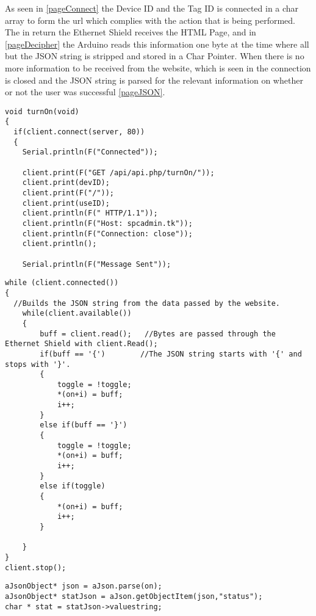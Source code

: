\documentclass{report}
\begin{document}
As seen in \autoref{pageConnect} the Device ID and the Tag ID is connected in a char array to form the url which complies with the action that is being performed. 
The in return the Ethernet Shield receives the HTML Page, and in \autoref{pageDecipher} the Arduino reads this information one byte at the time where all but the JSON string is stripped and stored in a Char Pointer.
When there is no more information to be received from the website, which is seen in  the connection is closed and the JSON string is parsed for the relevant information on whether or not the user was successful \autoref{pageJSON}.
\begin{lstlisting}[label=pageConnect, caption=Connecting to the Server and creating an HTML request.]
void turnOn(void)
{
  if(client.connect(server, 80))
  {
    Serial.println(F("Connected")); 

    client.print(F("GET /api/api.php/turnOn/"));
    client.print(devID);
    client.print(F("/"));
    client.print(useID);
    client.println(F(" HTTP/1.1"));
    client.println(F("Host: spcadmin.tk"));
    client.println(F("Connection: close"));
    client.println();
    
    Serial.println(F("Message Sent"));
\end{lstlisting}

\begin{lstlisting}[label=pageDecipher, caption=Removing all but the important information from the website.]
while (client.connected())
{
  //Builds the JSON string from the data passed by the website.
	while(client.available()) 
	{ 
		buff = client.read();   //Bytes are passed through the Ethernet Shield with client.Read();
		if(buff == '{')        //The JSON string starts with '{' and stops with '}'.
		{
			toggle = !toggle;
			*(on+i) = buff;
			i++;
		}
		else if(buff == '}')
		{
			toggle = !toggle;
			*(on+i) = buff;
			i++;
		}
		else if(toggle)
		{
			*(on+i) = buff;
			i++;
		}     

	}
}
client.stop();
\end{lstlisting}

\begin{lstlisting}[label=pageJSON, caption=The JSON Code Getting a value with a Token.]
aJsonObject* json = aJson.parse(on);
aJsonObject* statJson = aJson.getObjectItem(json,"status");
char * stat = statJson->valuestring;
\end{lstlisting}
\end{document}
